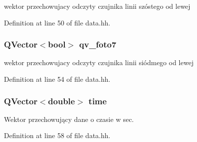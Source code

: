 wektor przechowujacy odczyty czujnika linii szóstego od lewej 



Definition at line 50 of file data.\+hh.

\subsubsection[{\texorpdfstring{qv\+\_\+foto7}{qv_foto7}}]{\setlength{\rightskip}{0pt plus 5cm}Q\+Vector$<$bool$>$ qv\+\_\+foto7}\hypertarget{data_8hh_ad7da896b30e4453fc5cbb04b34beb26a}{}\label{data_8hh_ad7da896b30e4453fc5cbb04b34beb26a}


wektor przechowujacy odczyty czujnika linii siódmego od lewej 



Definition at line 54 of file data.\+hh.

\subsubsection[{\texorpdfstring{time}{time}}]{\setlength{\rightskip}{0pt plus 5cm}Q\+Vector$<$double$>$ time}\hypertarget{data_8hh_a47dc728f262872d5f1d2bbdc7538e118}{}\label{data_8hh_a47dc728f262872d5f1d2bbdc7538e118}


Wektor przechowujący dane o czasie w sec. 



Definition at line 58 of file data.\+hh.

